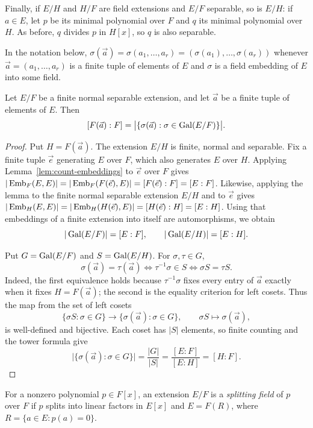 Finally, if $E/H$ and $H/F$ are field extensions and $E/F$ separable, so is $E/H$: if $a \in E$, let $p$ be its minimal polynomial over $F$ and $q$ its minimal polynomial over $H$.
As before, $q$ divides $p$ in $H[x]$, so $q$ is also separable.

In the notation below, $\sigma(\vec a)=\sigma(a_1,\ldots,a_r)=(\sigma(a_1),\ldots,\sigma(a_r))$ whenever $\vec a=(a_1,\ldots,a_r)$ is a finite tuple of elements of $E$ and $\sigma$ is a field embedding of $E$ into some field.

\begin{lemma}\label{lem:orbit}
Let $E/F$ be a finite normal separable extension, and let $\vec a$
be a finite tuple of elements of $E$. Then
\[
 [F(\vec a):F]
 =\bigl|\{\sigma(\vec a):\sigma\in\operatorname{Gal}(E/F)\}\bigr|.
\]
\end{lemma}

\begin{proof}
Put $H=F(\vec a)$. The extension $E/H$ is finite, normal and
separable.
Fix a finite tuple $\vec e$ generating $E$ over $F$, which also generates
$E$ over $H$. Applying Lemma~\ref{lem:count-embeddings} to $\vec e$ over
$F$ gives $
 |\operatorname{Emb}_F(E,E)|=|\operatorname{Emb}_F(F(\vec e),E)|=[F(\vec e):F]=[E:F]
$. Likewise, applying the lemma to the finite normal separable extension
$E/H$ and to $\vec e$ gives $
|\operatorname{Emb}_H(E,E)|= |\operatorname{Emb}_H(H(\vec e),E)|=[H(\vec e):H]=[E:H]$. Using that embeddings of a finite extension into itself are
automorphisms, we obtain
\[
 |\operatorname{Gal}(E/F)|=[E:F],\qquad |\operatorname{Gal}(E/H)|=[E:H].
\]

Put $G=\operatorname{Gal}(E/F)$ and $S=\operatorname{Gal}(E/H)$. For $\sigma,\tau\in G$,
\[
 \sigma(\vec a)=\tau(\vec a)
 \iff \tau^{-1}\sigma\in S
 \iff \sigma S=\tau S.
\]
Indeed, the first equivalence holds because $\tau^{-1}\sigma$ fixes
every entry of $\vec a$ exactly when it fixes $H=F(\vec a)$; the second
is the equality criterion for left cosets. Thus the map from the set of
left cosets
\[
 \{\sigma S:\sigma\in G\}\longrightarrow\{\sigma(\vec a):\sigma\in G\},
 \qquad \sigma S\longmapsto\sigma(\vec a),
\]
is well-defined and bijective.
Each coset has $|S|$ elements, so finite counting and the tower
formula give
\[
 \bigl|\{\sigma(\vec a):\sigma\in G\}\bigr|
 =\frac{|G|}{|S|}
 =\frac{[E:F]}{[E:H]}=[H:F].
\]
\end{proof}

For a nonzero polynomial $p\in F[x]$, an extension $E/F$ is a
\emph{splitting field} of $p$ over $F$ if $p$ splits into linear
factors in $E[x]$ and $E=F(R)$, where $R=\{a\in E:p(a)=0\}$.



